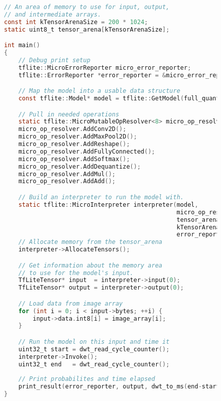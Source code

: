 \lstset{style=mystyle}
\begin{figure}[ht]
\begin{lstlisting}[language=C]
// An area of memory to use for input, output, 
// and intermediate arrays.
const int kTensorArenaSize = 200 * 1024;
static uint8_t tensor_arena[kTensorArenaSize];

int main() 
{
    // Debug print setup
    tflite::MicroErrorReporter micro_error_reporter;
    tflite::ErrorReporter *error_reporter = &micro_error_reporter;

    // Map the model into a usable data structure
    const tflite::Model* model = tflite::GetModel(full_quant_tflite);

    // Pull in needed operations
    static tflite::MicroMutableOpResolver<8> micro_op_resolver;
    micro_op_resolver.AddConv2D();
    micro_op_resolver.AddMaxPool2D();
    micro_op_resolver.AddReshape();
    micro_op_resolver.AddFullyConnected();
    micro_op_resolver.AddSoftmax();
    micro_op_resolver.AddDequantize();
    micro_op_resolver.AddMul();
    micro_op_resolver.AddAdd();

    // Build an interpreter to run the model with.
    static tflite::MicroInterpreter interpreter(model, 
                                                micro_op_resolver, 
                                                tensor_arena,
                                                kTensorArenaSize, 
                                                error_reporter);
    // Allocate memory from the tensor_arena
    interpreter->AllocateTensors();

    // Get information about the memory area 
    // to use for the model's input.
    TfLiteTensor* input  = interpreter->input(0);
    TfLiteTensor* output = interpreter->output(0);

    // Load data from image array
    for (int i = 0; i < input->bytes; ++i) {
        input->data.int8[i] = image_array[i];
    }

    // Run the model on this input and time it
    uint32_t start = dwt_read_cycle_counter();
    interpreter->Invoke();
    uint32_t end   = dwt_read_cycle_counter();
    
    // Print probabilites and time elapsed
    print_result(error_reporter, output, dwt_to_ms(end-start));
}
\end{lstlisting}
\label{inference_code}
\end{figure}

